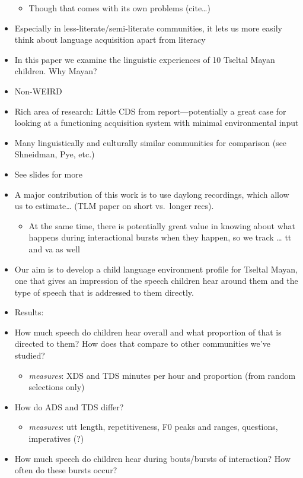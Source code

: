 \documentclass[man]{apa6}
\providecommand{\tightlist}{%
  \setlength{\itemsep}{0pt}\setlength{\parskip}{0pt}}
\theoremstyle{definition}
\theoremstyle{definition}
\theoremstyle{definition}
\theoremstyle{remark}
\begin{document}
\begin{itemize}
  \begin{itemize}
  \tightlist
  \item
    Though that comes with its own problems (cite\ldots{})
  \end{itemize}
\item
  Especially in less-literate/semi-literate communities, it lets us more
  easily think about language acquisition apart from literacy
\item
  In this paper we examine the linguistic experiences of 10 Tseltal
  Mayan children. Why Mayan?
\item
  Non-WEIRD
\item
  Rich area of research: Little CDS from report---potentially a great
  case for looking at a functioning acquisition system with minimal
  environmental input
\item
  Many linguistically and culturally similar communities for comparison
  (see Shneidman, Pye, etc.)
\item
  See slides for more
\item
  A major contribution of this work is to use daylong recordings, which
  allow us to estimate\ldots{} (TLM paper on short vs.~longer recs).

  \begin{itemize}
  \tightlist
  \item
    At the same time, there is potentially great value in knowing about
    what happens during interactional bursts when they happen, so we
    track \ldots{} tt and va as well
  \end{itemize}
\item
  Our aim is to develop a child language environment profile for Tseltal
  Mayan, one that gives an impression of the speech children hear around
  them and the type of speech that is addressed to them directly. 
\item
  Results:
\item
  How much speech do children hear overall and what proportion of that
  is directed to them? How does that compare to other communities we've
  studied?

  \begin{itemize}
  \tightlist
  \item
    \emph{measures}: XDS and TDS minutes per hour and proportion (from
    random selections only)
  \end{itemize}
\item
  How do ADS and TDS differ?

  \begin{itemize}
  \tightlist
  \item
    \emph{measures}: utt length, repetitiveness, F0 peaks and ranges,
    questions, imperatives (?)
  \end{itemize}
\item
  How much speech do children hear during bouts/bursts of interaction?
  How often do these bursts occur?


\end{itemize}
\end{document}
